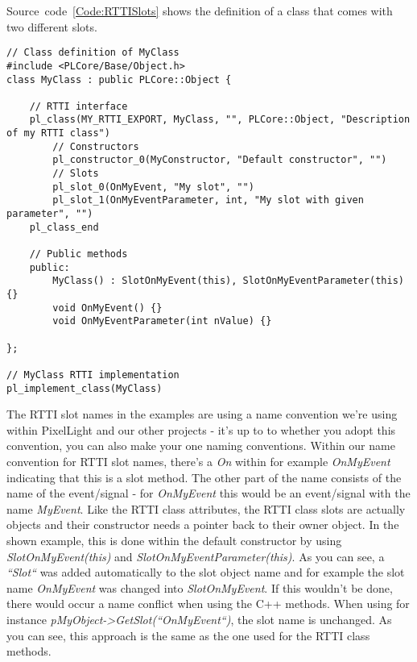 Source~code~\ref{Code:RTTISlots} shows the definition of a class that comes with two different slots.
\begin{lstlisting}[label=Code:RTTISlots,caption={Definition of \ac{RTTI} class slots with parameters}]
// Class definition of MyClass
#include <PLCore/Base/Object.h>
class MyClass : public PLCore::Object {

	// RTTI interface
	pl_class(MY_RTTI_EXPORT, MyClass, "", PLCore::Object, "Description of my RTTI class")
		// Constructors
		pl_constructor_0(MyConstructor, "Default constructor", "")
		// Slots
		pl_slot_0(OnMyEvent, "My slot", "")
		pl_slot_1(OnMyEventParameter, int, "My slot with given parameter", "")
	pl_class_end

	// Public methods
	public:
		MyClass() : SlotOnMyEvent(this), SlotOnMyEventParameter(this) {}
		void OnMyEvent() {}
		void OnMyEventParameter(int nValue) {}

};

// MyClass RTTI implementation
pl_implement_class(MyClass)
\end{lstlisting}
The \ac{RTTI} slot names in the examples are using a name convention we're using within PixelLight and our other projects - it's up to to whether you adopt this convention, you can also make your one naming conventions. Within our name convention for \ac{RTTI} slot names, there's a \emph{On} within for example \emph{OnMyEvent} indicating that this is a slot method. The other part of the name consists of the name of the event/signal - for \emph{OnMyEvent} this would be an event/signal with the name \emph{MyEvent}. Like the \ac{RTTI} class attributes, the \ac{RTTI} class slots are actually objects and their constructor needs a pointer back to their owner object. In the shown example, this is done within the default constructor by using \emph{SlotOnMyEvent(this)} and \emph{SlotOnMyEventParameter(this)}. As you can see, a \emph{``Slot``} was added automatically to the slot object name and for example the slot name \emph{OnMyEvent} was changed into \emph{SlotOnMyEvent}. If this wouldn't be done, there would occur a name conflict when using the C++ methods. When using for instance \emph{pMyObject->GetSlot(``OnMyEvent``)}, the slot name is unchanged. As you can see, this approach is the same as the one used for the \ac{RTTI} class methods.

